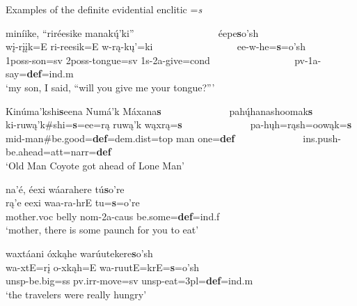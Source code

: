 \begin{exe}

\item\label{definiteevidential} Examples of the definite evidential enclitic =\textit{s}

	\begin{xlist}
	
	\item\label{definiteevidential1}
	\glll miníike, ``riréesike manakų́'ki'' ~ ~ ~ ~ ~ ~ ~ ~ ~ ~ éepe\textbf{s}o'sh\\
	wį-rįįk=E ri-reesik=E w-rą-kų'=ki ~ ~ ~ ~ ~ ~ ~ ~ ~ ~  ee-w-he=\textbf{s}=o'sh\\
	1poss-\textnormal{son}=sv 2poss-\textnormal{tongue}=sv 1s-2a-\textnormal{give}=cond ~ ~ ~ ~ ~ ~ ~ ~ ~ ~  pv-1a-\textnormal{say}=\textbf{def}=ind.m\\
	\glt `my son, I said, ``will you give me your tongue?''' \citep[190]{hollow1973a} 

	\item\label{definiteevidential2}
	\glll Kinúma'kshi\textbf{s}eena Numá'k Máxana\textbf{s} ~ ~ ~ ~ ~ ~ ~ ~ pahų́hanashoomak\textbf{s}\\
	ki-ruwą'k\#shi=\textbf{s}=ee=rą ruwą'k wąxrą=\textbf{s} ~ ~ ~ ~ ~ ~ ~ ~ pa-hųh=rąsh=oowąk=\textbf{s}\\
	mid-\textnormal{man}\#\textnormal{be.good}=\textbf{def}=dem.dist=top \textnormal{man} \textnormal{one}=\textbf{def} ~ ~ ~ ~ ~ ~ ~ ~  ins.push-\textnormal{be.ahead}=att=narr=\textbf{def}\\
	\glt `Old Man Coyote got ahead of Lone Man' \citep[9]{hollow1973a}

	\item\label{definiteevidential3}
	\glll na'é, éexi wáarahere tú\textbf{s}o're\\
	rą'e eexi waa-ra-hrE tu=\textbf{s}=o're\\
	\textnormal{mother}.voc \textnormal{belly} nom-2a-caus \textnormal{be.some}=\textbf{def}=ind.f\\
	\glt `mother, there is some paunch for you to eat' \citep[72]{hollow1973a}

	\item\label{definiteevidential4}
	\glll waxtáani óxkąhe warúutekere\textbf{s}o'sh\\
	wa-xtE=rį o-xkąh=E wa-ruutE=krE=\textbf{s}=o'sh\\
	unsp-\textnormal{be.big}=ss pv.irr-\textnormal{move}=sv unsp-\textnormal{eat}=3pl=\textbf{def}=ind.m\\
	\glt `the travelers were really hungry' \citep[80]{hollow1973b}


\end{xlist}
\end{exe}

